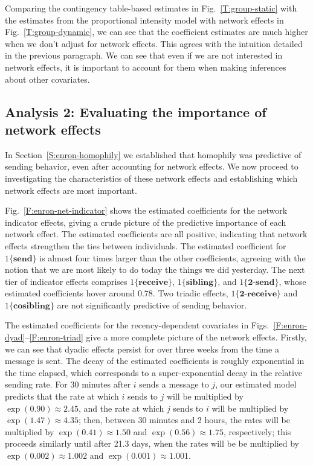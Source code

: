 \documentclass[final]{statsoc}
\begin{document}
Comparing the contingency table-based estimates in Fig.~\ref{T:group-static}
with the estimates from the proportional intensity model with network effects
in Fig.~\ref{T:group-dynamic}, we can see that the coefficient estimates are
much higher when we don't adjust for network effects.  This agrees with the
intuition detailed in the previous paragraph.  We can see that even if we are
not interested in network effects, it is important to account for them when
making inferences about other covariates.


\subsection{Analysis 2: Evaluating the importance of network effects}
\label{S:enron-network}

In Section~\ref{S:enron-homophily} we established that homophily was
predictive of sending behavior, even after accounting for network effects.  We
now proceed to investigating the characteristics of these network effects and
establishing which network effects are most important.

Fig.~\ref{F:enron-net-indicator} shows the estimated coefficients for the
network indicator effects, giving a crude picture of the predictive importance
of each network effect.  The estimated coefficients are all positive,
indicating that network effects strengthen the ties between individuals.  The
estimated coefficient for $1\{\textbf{send}\}$ is almost four times larger
than the other coefficients, agreeing with the notion that we are most likely
to do today the things we did yesterday.  The next tier of indicator effects
comprises $1\{\textbf{receive}\}$, $1\{\textbf{sibling}\}$, and
$1\{\textbf{2-send}\}$, whose estimated coefficients hover around $0.78$.
Two triadic effects, $1\{\textbf{2-receive}\}$ and
$1\{\textbf{cosibling}\}$ are not significantly predictive of sending behavior.

The estimated coefficients for the recency-dependent covariates in
Figs.~\ref{F:enron-dyad}--\ref{F:enron-triad} give a more complete
picture of the network effects.  Firstly, we can see that dyadic effects
persist for over three weeks from the time a message is sent.  The decay of
the estimated coefficients is roughly exponential in the time elapsed, which
corresponds to a super-exponential decay in the relative sending rate.  For 30
minutes after $i$ sends a message to $j$, our estimated model predicts that
the rate at which $i$ sends to $j$ will be multiplied by $\exp(0.90) \approx
2.45$, and the rate at which $j$ sends to $i$ will be multiplied by $\exp(1.47)
\approx 4.35$; then, between 30 minutes and 2 hours, the rates will be
multiplied by $\exp(0.41) \approx 1.50$ and $\exp(0.56) \approx 1.75$,
respectively; this proceeds similarly until after 21.3 days, when the rates
will be be multiplied by $\exp(0.002) \approx 1.002$ and $\exp(0.001) \approx
1.001$.
\end{document}
